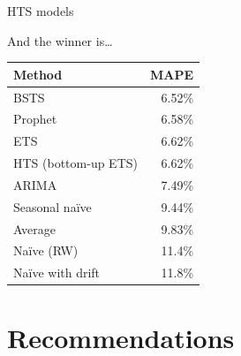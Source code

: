 \documentclass[12pt,aspectratio=169]{beamer}
\begin{document}
\begin{frame}{HTS models}
\end{frame}

\begin{frame}{And the winner is\ldots}
    \centering%
    \begin{tabular}{lr}
        \toprule
        \textbf{Method} & \textbf{MAPE} \\
        \midrule
        BSTS                     & 6.52\% \\
        Prophet                  & 6.58\% \\
        ETS                      & 6.62\% \\
        HTS (bottom\hyp{}up ETS) & 6.62\% \\
        ARIMA                    & 7.49\% \\
        Seasonal naïve           & 9.44\% \\
        Average                  & 9.83\% \\
        Naïve (RW)               & 11.4\% \\
        Naïve with drift         & 11.8\% \\
        \bottomrule
    \end{tabular}
\end{frame}

\section{Recommendations}
\end{document}
